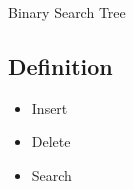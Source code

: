 \begin{section}
    {Binary Search Tree}

\subsection*{Definition}
\begin{itemize}
    \item Insert
    \item Delete
    \item Search
\end{itemize}

\noindent\bigskip
\textbf{}

\end{section}